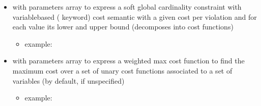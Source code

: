 \documentclass[letterpaper,10pt,openany,oneside,english]{sphinxmanual}
\begin{document}
\begin{itemize}
\begin{itemize}
\end{itemize}

\item {} 
\sphinxAtStartPar
{} with parameters array  to express a soft global cardinality constraint with variable\sphinxhyphen{}based ( keyword) cost semantic with a given cost per violation and for each value its lower and upper bound (decomposes into  cost functions)
\begin{itemize}
\item {} 
\sphinxAtStartPar
example:

\begin{sphinxVerbatim}[commandchars=\\\{\}]
  \PYG{p}{[}   \PYG{p}{]}
        
        
           
           
           \PYG{p}{[}\PYG{p}{[}  \PYG{p}{]} \PYG{p}{[}  \PYG{p}{]}\PYG{p}{]}
\end{sphinxVerbatim}

\end{itemize}

\item {} 
\sphinxAtStartPar
{} with parameters array  to express a weighted max cost function to find the maximum cost over a set of unary cost functions associated to a set of variables (by default,  if unspecified)
\begin{itemize}
\item {} 
\sphinxAtStartPar
example:

\begin{sphinxVerbatim}[commandchars=\\\{\}]
  \PYG{p}{[}   \PYG{p}{]}
         
        
           
           \PYG{p}{[}\PYG{p}{[}  \PYG{p}{]} \PYG{p}{[}  \PYG{p}{]}\PYG{p}{[}  \PYG{p}{]}\PYG{p}{[}  \PYG{p}{]}\PYG{p}{]}
\end{sphinxVerbatim}


\end{itemize}
\end{itemize}
\end{document}
